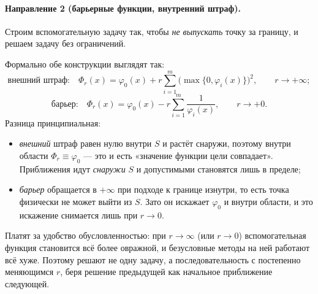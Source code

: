 \paragraph{Направление 2 (барьерные функции, внутренний штраф).}
Строим вспомогательную задачу так, чтобы \emph{не выпускать} точку за границу,
и решаем задачу без ограничений.


\begin{idea}
Формально обе конструкции выглядят так:
\[
  \text{внешний штраф:}\quad
  \Phi_r(x) = \varphi_0(x) + r \sum_{i=1}^{m} \big(\max\{0, \varphi_i(x)\}\big)^2 ,
  \qquad r \to +\infty ;
\]
\[
  \text{барьер:}\quad
  \Phi_r(x) = \varphi_0(x) - r \sum_{i=1}^{m} \frac{1}{\varphi_i(x)} ,
  \qquad r \to +0 .
\]
Разница принципиальная:
\begin{itemize}[nosep,left=0pt]
  \item \emph{внешний} штраф равен нулю внутри $S$ и растёт снаружи, поэтому
        внутри области $\Phi_r \equiv \varphi_0$ — это и есть «значение функции
        цели совпадает». Приближения идут \emph{снаружи} $S$ и допустимыми
        становятся лишь в пределе;
  \item \emph{барьер} обращается в $+\infty$ при подходе к границе изнутри, то
        есть точка физически не может выйти из $S$. Зато он искажает $\varphi_0$
        и внутри области, и это искажение снимается лишь при $r \to 0$.
\end{itemize}
Платят за удобство обусловленностью: при $r \to \infty$ (или $r \to 0$)
вспомогательная функция становится всё более овражной, и безусловные методы на
ней работают всё хуже. Поэтому решают не одну задачу, а последовательность с
постепенно меняющимся $r$, беря решение предыдущей как начальное приближение
следующей.
\end{idea}
